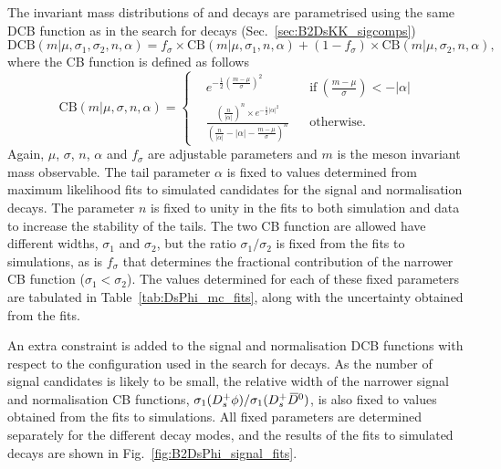 The invariant mass distributions of \decay{\Bp}{\Dsp\phiz} and \decay{\Bp}{\Dsp\Dzb} decays are parametrised using the same DCB function as in the search for \decay{\Bp}{\Dsp\Kp\Km} decays (Sec.~\ref{sec:B2DsKK_sigcomps})
\begin{equation}
\text{DCB}(m|\mu,\sigma_1,\sigma_2,n,\alpha) = f_\sigma \times \text{CB}(m|\mu,\sigma_1,n,\alpha) + (1-f_\sigma) \times \text{CB}(m|\mu,\sigma_2,n,\alpha),
\label{eq:DoubleBD}
\end{equation}
where the CB function is defined as follows
\begin{equation}
\text{CB}(m|\mu,\sigma,n,\alpha) = \left \{
  \begin{aligned}
    &e^{-\frac{1}{2} \left(\frac{m-\mu}{\sigma}\right)^2} && \text{if}\ \left(\frac{m-\mu}{\sigma}\right) < -|\alpha|\\
    &\frac{\left(\frac{n}{|\alpha|}\right)^n\times e ^{-\frac{1}{2}|\alpha|^2} }{\left(\frac{n}{|\alpha|}-|\alpha| - \frac{m-\mu}{\sigma}\right)^n} && \text{otherwise.}
  \end{aligned} \right.
\end{equation}
Again, $\mu$, $\sigma$, $n$, $\alpha$ and $f_{\sigma}$ are adjustable parameters and $m$ is the \B meson invariant mass observable.
The tail parameter $\alpha$ is fixed to values determined from maximum likelihood fits to simulated candidates for the signal and normalisation decays. The parameter $n$ is fixed to unity in the fits to both simulation and data to increase the stability of the tails.     
The two CB function are allowed have different widths, $\sigma_{1}$ and $\sigma_{2}$, but the ratio $\sigma_{1}/\sigma_{2}$ is fixed from the fits to simulations, as is $f_{\sigma}$ that determines the fractional contribution of the narrower CB function ($\sigma_{1}<\sigma_{2}$). The values determined for each of these fixed parameters are tabulated in Table~\ref{tab:DsPhi_mc_fits}, along with the uncertainty obtained from the fits.

An extra constraint is added to the signal and normalisation DCB functions with respect to the configuration used in the search for \decay{\Bp}{\Dsp\Kp\Km} decays. As the number of signal candidates is likely to be small, the relative width of the narrower signal and normalisation CB functions, $\sigma_{1}({{D}^+_{s}}\phi) / \sigma_{1}({{D}^+_{s}}{{\kern 0.2em\overline{\kern -0.2em D}{}}{}^0})$, is also fixed to values obtained from the fits to simulations. All fixed parameters are determined separately for the different \Dsp decay modes, and the results of the fits to simulated decays are shown in Fig.~\ref{fig:B2DsPhi_signal_fits}.     


